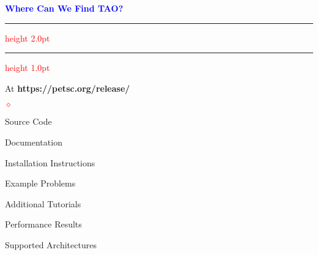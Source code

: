 \documentclass{seminar}
\newcommand{\reddiamond}{\textcolor{red}{$\diamond$}}
\newcommand{\redstripe}{\textcolor{red}{\hrule height 2.0pt\hfil}
             \vspace{-1.8pt}
             \textcolor{red}{\hrule height 1.0pt\hfil}
}
\newcommand{\heading}[1]{%
   \centerline{\textcolor{blue}{\textbf{#1}}}%
    \redstripe%
    \bigskip
}
\begin{document}
\begin{slide}
\heading{Where Can We Find TAO?}

At {\bf https://petsc.org/release/}

\begin{list}{\reddiamond}{\leftmargin=1in}
\item
Source Code
\item
Documentation
\item
Installation Instructions
\item
Example Problems
\item
Additional Tutorials
\item
Performance Results
\item
Supported Architectures
\end{list}

\vfill

\end{slide}
\end{document}
